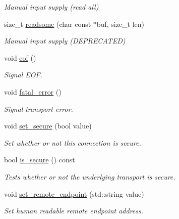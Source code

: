 \begin{DoxyCompactItemize}
\begin{DoxyCompactList}\small\item\em Manual input supply (read all) \end{DoxyCompactList}\item 
size\+\_\+t \hyperlink{classwebsocketpp_1_1transport_1_1iostream_1_1connection_a72f532fb0a8d339371b8ca112fdd3f66}{readsome} (char const $\ast$buf, size\+\_\+t len)
\begin{DoxyCompactList}\small\item\em Manual input supply (D\+E\+P\+R\+E\+C\+A\+T\+E\+D) \end{DoxyCompactList}\item 
void \hyperlink{classwebsocketpp_1_1transport_1_1iostream_1_1connection_a88529f4130f75beed493c84c861e66cf}{eof} ()
\begin{DoxyCompactList}\small\item\em Signal E\+O\+F. \end{DoxyCompactList}\item 
void \hyperlink{classwebsocketpp_1_1transport_1_1iostream_1_1connection_a3fdd2b1f005daafa73bffe45063a7750}{fatal\+\_\+error} ()
\begin{DoxyCompactList}\small\item\em Signal transport error. \end{DoxyCompactList}\item 
void \hyperlink{classwebsocketpp_1_1transport_1_1iostream_1_1connection_a34443f9921e85115607304397d43cc8f}{set\+\_\+secure} (bool value)
\begin{DoxyCompactList}\small\item\em Set whether or not this connection is secure. \end{DoxyCompactList}\item 
bool \hyperlink{classwebsocketpp_1_1transport_1_1iostream_1_1connection_a9cfff833a9e17ff89b7de72e515dfd57}{is\+\_\+secure} () const 
\begin{DoxyCompactList}\small\item\em Tests whether or not the underlying transport is secure. \end{DoxyCompactList}\item 
void \hyperlink{classwebsocketpp_1_1transport_1_1iostream_1_1connection_a846340a41ebbce1a6a1cecfd9026c2e9}{set\+\_\+remote\+\_\+endpoint} (std\+::string value)
\begin{DoxyCompactList}\small\item\em Set human readable remote endpoint address. \end{DoxyCompactList}\item 

\end{DoxyCompactItemize}
